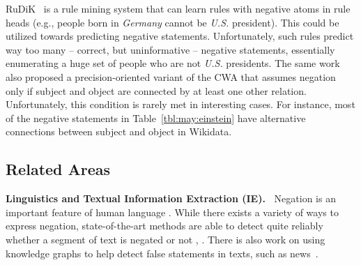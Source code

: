 RuDiK~\cite{ortona2018rudik} is a rule mining system that can learn rules with negative atoms in rule heads (e.g., people born in \textit{Germany} cannot be
\textit{U.S.} president). This could be utilized towards predicting negative statements. %
Unfortunately, such rules predict way too many -- correct, but uninformative -- negative statements, essentially enumerating a huge set of people who are not \textit{U.S.} presidents. 
The same work also proposed a precision-oriented variant of the CWA that assumes negation only if subject and object are connected by at least one other relation. Unfortunately, this condition is rarely met in interesting cases. For instance, most of the negative statements in Table~\ref{tbl:may:einstein} have alternative connections between subject and object in Wikidata.




\subsection{Related Areas}

\noindent
\textbf{\small Linguistics and Textual Information Extraction (IE).\ } Negation is an important feature of human language \cite{Morante2012}. While there exists a variety of ways to express negation, state-of-the-art methods are able to detect quite reliably whether a segment of text is negated or not \cite{extendingnegex}, \cite{wu2014}.  There is also work on using knowledge graphs to help detect false statements in texts, such as news~\cite{PPLL+2018}. %
%

